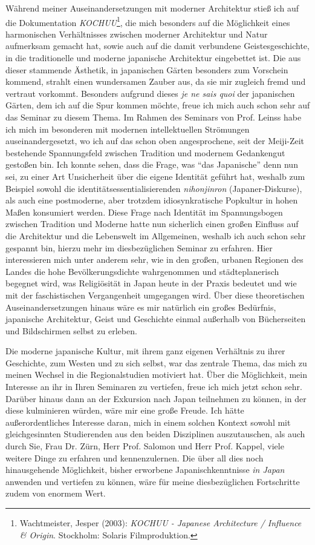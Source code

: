 \documentclass[a4paper]{article}
\begin{document}
Während meiner Auseinandersetzungen mit moderner Architektur stieß ich auf die Dokumentation \emph{KOCHUU}\footnote{Wachtmeister, Jesper (2003): \emph{KOCHUU - Japanese Architecture / Influence \& Origin}. Stockholm: Solaris Filmproduktion.}, die mich besonders auf die Möglichkeit eines harmonischen Verhältnisses zwischen moderner Architektur und Natur aufmerksam gemacht hat, sowie auch auf die damit verbundene Geistesgeschichte, in die traditionelle und moderne japanische Architektur eingebettet ist. Die aus dieser stammende Ästhetik, in japanischen Gärten besonders zum Vorschein kommend, strahlt einen wundersamen Zauber aus, da sie mir zugleich fremd und vertraut vorkommt. Besonders aufgrund dieses \emph{je ne sais quoi} der japanischen Gärten, dem ich auf die Spur kommen möchte, freue ich mich auch schon sehr auf das Seminar zu diesem Thema. Im Rahmen des Seminars von Prof. Leinss habe ich mich im besonderen mit modernen intellektuellen Strömungen auseinandergesetzt, wo ich auf das schon oben angesprochene, seit der Meiji-Zeit bestehende Spannungsfeld zwischen Tradition und modernem Gedankengut gestoßen bin. Ich konnte sehen, dass die Frage, was "`das Japanische"' denn nun sei, zu einer Art Unsicherheit über die eigene Identität geführt hat, weshalb zum Beispiel sowohl die identitätsessentialisierenden \emph{nihonjinron} (Japaner-Diskurse), als auch eine postmoderne, aber trotzdem idiosynkratische Popkultur in hohen Maßen konsumiert werden. Diese Frage nach Identität im Spannungsbogen zwischen Tradition und Moderne hatte nun sicherlich einen großen Einfluss auf die Architektur und die Lebenswelt im Allgemeinen, weshalb ich auch schon sehr gespannt bin, hierzu mehr im diesbezüglichen Seminar zu erfahren. Hier interessieren mich unter anderem sehr, wie in den großen, urbanen Regionen des Landes die hohe Bevölkerungsdichte wahrgenommen und städteplanerisch begegnet wird, was Religiösität in Japan heute in der Praxis bedeutet und wie mit der faschistischen Vergangenheit umgegangen wird. Über diese theoretischen Auseinandersetzungen hinaus wäre es mir natürlich ein großes Bedürfnis, japanische Architektur, Geist und Geschichte einmal außerhalb von Bücherseiten und Bildschirmen selbst zu erleben.

Die moderne japanische Kultur, mit ihrem ganz eigenen Verhältnis zu ihrer Geschichte, zum Westen und zu sich selbst, war das zentrale Thema, das mich zu meinen Wechsel in die Regionalstudien motiviert hat. Über die Möglichkeit, mein Interesse an ihr in Ihren Seminaren zu vertiefen, freue ich mich jetzt schon sehr. Darüber hinaus dann an der Exkursion nach Japan teilnehmen zu können, in der diese kulminieren würden, wäre mir eine große Freude. Ich hätte außerordentliches Interesse daran, mich in einem solchen Kontext sowohl mit gleichgesinnten Studierenden aus den beiden Disziplinen auszutauschen, als auch durch Sie, Frau Dr. Zürn, Herr Prof. Salomon und Herr Prof. Kappel, viele weitere Dinge zu erfahren und kennenzulernen. Die über all dies noch hinausgehende Möglichkeit, bisher erworbene Japanischkenntnisse \emph{in Japan} anwenden und vertiefen zu können, wäre für meine diesbezüglichen Fortschritte zudem von enormem Wert.

\newpage
\printbibliography
\end{document}
